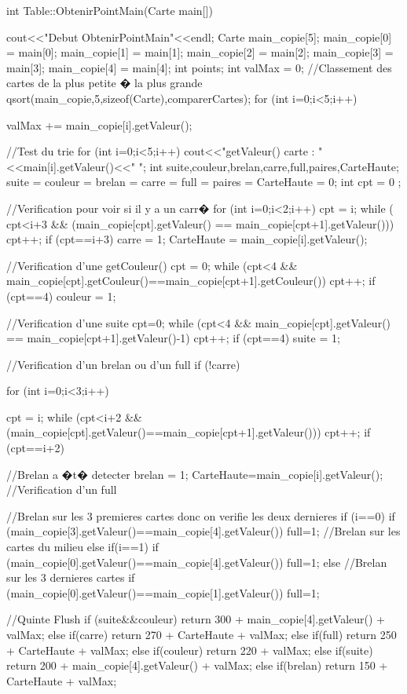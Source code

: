 \documentclass{article}
\begin{document}
int Table::ObtenirPointMain(Carte main[])
{
  cout<<"Debut ObtenirPointMain"<<endl;
	Carte main_copie[5];
	main_copie[0] = main[0];
	main_copie[1] = main[1];
	main_copie[2] = main[2];
	main_copie[3] = main[3];
	main_copie[4] = main[4];
    	int points;
    	int valMax = 0;
    //Classement des cartes de la plus petite � la plus grande
    qsort(main_copie,5,sizeof(Carte),comparerCartes);
     for (int i=0;i<5;i++)
     {
	valMax += main_copie[i].getValeur();

     }



     //Test du trie
        for (int i=0;i<5;i++)
             {
                  cout<<"getValeur() carte : "<<main[i].getValeur()<<" ";
             }
    int suite,couleur,brelan,carre,full,paires,CarteHaute;
    suite = couleur = brelan = carre = full = paires = CarteHaute = 0;
    int cpt = 0 ;

    //Verification pour voir si il y a un carr�
    for (int i=0;i<2;i++){
        cpt = i;
        while (  cpt<i+3 && (main_copie[cpt].getValeur() == main_copie[cpt+1].getValeur()))
              cpt++;
        if (cpt==i+3){
           carre = 1;
           CarteHaute = main_copie[i].getValeur();
        }
    }

    //Verification d'une getCouleur()
    cpt = 0;
    while (cpt<4 && main_copie[cpt].getCouleur()==main_copie[cpt+1].getCouleur())
          cpt++;
    if (cpt==4){
       couleur = 1;
    }

    //Verification d'une suite
    cpt=0;
    while (cpt<4 && main_copie[cpt].getValeur() == main_copie[cpt+1].getValeur()-1)
    {
          cpt++;
    }
    if (cpt==4)
       suite = 1;



    //Verification d'un brelan ou d'un full
    if (!carre){
       for (int i=0;i<3;i++){
           cpt = i;
           while (cpt<i+2 && (main_copie[cpt].getValeur()==main_copie[cpt+1].getValeur()))
           {
                 cpt++;
           }
           if (cpt==i+2){
              //Brelan a �t� detecter
              brelan = 1;
              CarteHaute=main_copie[i].getValeur();
              //Verification d'un full

              //Brelan sur  les 3 premieres cartes donc on verifie les deux dernieres
              if (i==0){
                 if (main_copie[3].getValeur()==main_copie[4].getValeur())
                    full=1;
              }
              //Brelan sur les cartes du milieu
              else if(i==1){
                   if (main_copie[0].getValeur()==main_copie[4].getValeur())
                      full=1;
              }
              else{
              //Brelan sur les 3 dernieres cartes
                   if (main_copie[0].getValeur()==main_copie[1].getValeur())
                      full=1;
              }
           }
       }
    }
    //Quinte Flush
    if (suite&&couleur)
         return 300 + main_copie[4].getValeur() + valMax;
    else if(carre)
         return 270 + CarteHaute + valMax;
    else if(full)
         return 250 + CarteHaute + valMax;
    else if(couleur)
         return 220 + valMax;
    else if(suite)
    {
         return 200 + main_copie[4].getValeur() + valMax;
    }
    else if(brelan)
         return 150 + CarteHaute + valMax;

}
\end{document}

